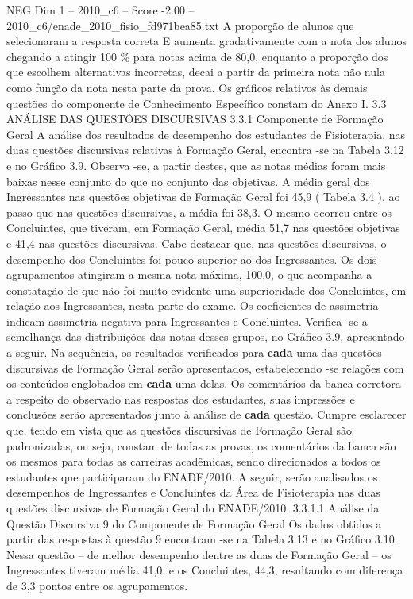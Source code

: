 \begin{textsample}{NEG Dim 1 – 2010\_c6 – Score -2.00 – 2010\_c6/enade\_2010\_fisio\_fd971bea85.txt}
A proporção de alunos que selecionaram a resposta correta E aumenta gradativamente com a nota dos alunos chegando a atingir 100 \% para notas acima de 80,0, enquanto a proporção dos que escolhem alternativas incorretas, decai a partir da primeira nota não nula como função da nota nesta parte da prova.
Os gráficos relativos às demais questões do componente de Conhecimento Específico constam do Anexo I. 3.3 ANÁLISE DAS QUESTÕES DISCURSIVAS 3.3.1 Componente de Formação Geral A análise dos resultados de desempenho dos estudantes de Fisioterapia, nas duas questões discursivas relativas à Formação Geral, encontra -se na Tabela 3.12 e no Gráfico 3.9.
Observa -se, a partir destes, que as notas médias foram mais baixas nesse conjunto do que no conjunto das objetivas.
A média geral dos Ingressantes nas questões objetivas de Formação Geral foi 45,9 ( Tabela 3.4 ), ao passo que nas questões discursivas, a média foi 38,3.
O mesmo ocorreu entre os Concluintes, que tiveram, em Formação Geral, média 51,7 nas questões objetivas e 41,4 nas questões discursivas.
Cabe destacar que, nas questões discursivas, o desempenho dos Concluintes foi pouco superior ao dos Ingressantes.
Os dois agrupamentos atingiram a mesma nota máxima, 100,0, o que acompanha a constatação de que não foi muito evidente uma superioridade dos Concluintes, em relação aos Ingressantes, nesta parte do exame.
Os coeficientes de assimetria indicam assimetria negativa para Ingressantes e Concluintes.
Verifica -se a semelhança das distribuições das notas desses grupos, no Gráfico 3.9, apresentado a seguir.
Na sequência, os resultados verificados para \textbf{cada} uma das questões discursivas de Formação Geral serão apresentados, estabelecendo -se relações com os conteúdos englobados em \textbf{cada} uma delas.
Os comentários da banca corretora a respeito do observado nas respostas dos estudantes, suas impressões e conclusões serão apresentados junto à análise de \textbf{cada} questão.
Cumpre esclarecer que, tendo em vista que as questões discursivas de Formação Geral são padronizadas, ou seja, constam de todas as provas, os comentários da banca são os mesmos para todas as carreiras acadêmicas, sendo direcionados a todos os estudantes que participaram do ENADE/2010.
A seguir, serão analisados os desempenhos de Ingressantes e Concluintes da Área de Fisioterapia nas duas questões discursivas de Formação Geral do ENADE/2010. 3.3.1.1 Análise da Questão Discursiva 9 do Componente de Formação Geral Os dados obtidos a partir das respostas à questão 9 encontram -se na Tabela 3.13 e no Gráfico 3.10.
Nessa questão – de melhor desempenho dentre as duas de Formação Geral – os Ingressantes tiveram média 41,0, e os Concluintes, 44,3, resultando com diferença de 3,3 pontos entre os agrupamentos.

\end{textsample}
